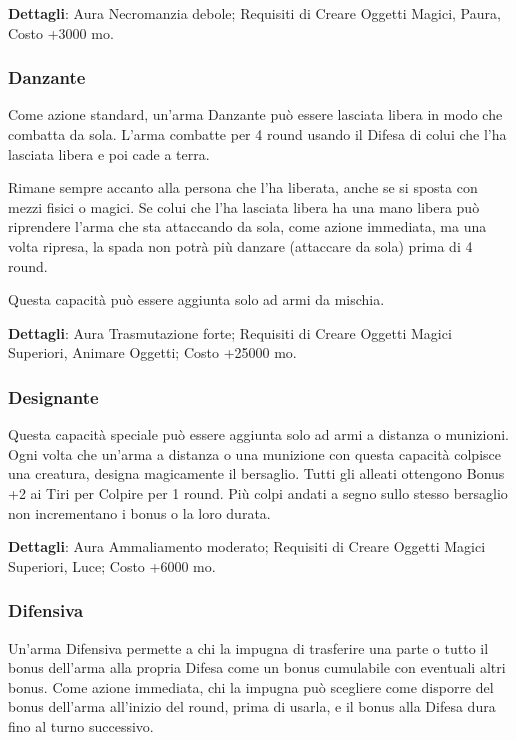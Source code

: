 \begin{multicols}{2}
	\textbf{Dettagli}: Aura Necromanzia debole; Requisiti di Creare Oggetti Magici, Paura, Costo +3000 mo.

	\subsubsection*{Danzante}

	Come azione standard, un'arma Danzante può essere lasciata libera in modo che combatta da sola. L'arma combatte per 4 round usando il Difesa di colui che l'ha lasciata libera e poi cade a terra.

	Rimane sempre accanto alla persona che l'ha liberata, anche se si sposta con mezzi fisici o magici. Se colui che l'ha lasciata libera ha una mano libera può riprendere l'arma che sta attaccando da sola, come azione immediata, ma una volta ripresa, la spada non potrà più danzare (attaccare da sola) prima di 4 round.

	Questa capacità può essere aggiunta solo ad armi da mischia.

	\textbf{Dettagli}: Aura Trasmutazione forte; Requisiti di Creare Oggetti Magici Superiori, Animare Oggetti; Costo +25000 mo.

	\subsubsection*{Designante}

	Questa capacità speciale può essere aggiunta solo ad armi a distanza o munizioni. Ogni volta che un'arma a distanza o una munizione con questa capacità colpisce una creatura, designa magicamente il bersaglio. Tutti gli alleati ottengono Bonus +2 ai Tiri per Colpire per 1 round. Più colpi andati a segno sullo stesso bersaglio non incrementano i bonus o la loro durata.

	\textbf{Dettagli}: Aura Ammaliamento moderato; Requisiti di Creare Oggetti Magici Superiori, Luce; Costo +6000 mo.

	\subsubsection*{Difensiva}

	Un'arma Difensiva permette a chi la impugna di trasferire una parte o tutto il bonus dell'arma alla propria Difesa come un bonus cumulabile con eventuali altri bonus. Come azione immediata, chi la impugna può scegliere come disporre del bonus dell'arma all'inizio del round, prima di usarla, e il bonus alla Difesa dura fino al turno successivo.


\end{multicols}
